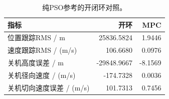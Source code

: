 \begin{table}[H]\centering\small
\caption{纯PSO参考的开闭环对照。}\label{tab:mpc}
\begin{tabular}{lrr}\toprule
指标 & 开环 & MPC\\\midrule
位置跟踪RMS / m & 25836.5824 & 1.9446\\
速度跟踪RMS / (m/s) & 106.6680 & 0.0976\\
关机高度误差 / m & -29848.9667 & -8.1569\\
关机径向速度 / (m/s) & -174.7328 & 0.0036\\
关机切向速度误差 / (m/s) & 101.7313 & 0.7456\\
\bottomrule\end{tabular}\end{table}